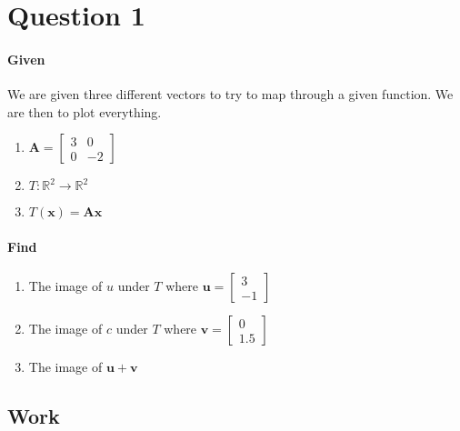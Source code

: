 \documentclass{article}
\begin{document}
\section{Question 1}
    \paragraph{Given}
        We are given three different vectors to try to map through a
        given function. We are then to plot everything.
        \begin{enumerate}
            \item $\mathbf{A} = \begin{bmatrix}3 & 0\\0 & -2\end{bmatrix}$
            \item $T: \mathbb{R}^2 \rightarrow \mathbb{R}^2 $ 
            \item$T(\mathbf{x})=\mathbf{A}\mathbf{x}$
        \end{enumerate}
    \paragraph{Find}
        \begin{enumerate}
            \item 
                The image of $u$ under $T$ where
                $\mathbf{u} = \begin{bmatrix}3\\-1\end{bmatrix}$
            \item 
                The image of $c$ under $T$ where
                $\mathbf{v} = \begin{bmatrix}0\\1.5\end{bmatrix}$
            \item The image of $\mathbf{u} + \mathbf{v}$
        \end{enumerate}
    \subsection{Work}
\end{document}
